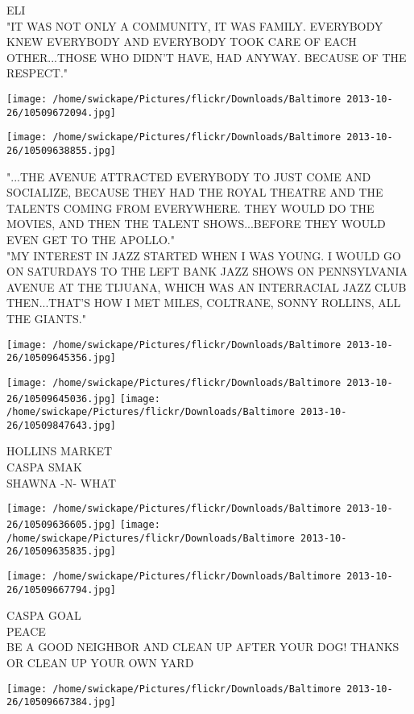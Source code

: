 \documentclass[10pt,letterpaper]{article}
\begin{document}
ELI\\
"IT WAS NOT ONLY A COMMUNITY, IT WAS FAMILY.  EVERYBODY KNEW EVERYBODY AND EVERYBODY TOOK CARE OF EACH OTHER...THOSE WHO DIDN'T HAVE, HAD ANYWAY.  BECAUSE OF THE RESPECT."
\pagebreak

\texttt{[image: /home/swickape/Pictures/flickr/Downloads/Baltimore 2013-10-26/10509672094.jpg]}

\vspace{0.25in}
\texttt{[image: /home/swickape/Pictures/flickr/Downloads/Baltimore 2013-10-26/10509638855.jpg]}

"...THE AVENUE ATTRACTED EVERYBODY TO JUST COME AND SOCIALIZE, BECAUSE THEY HAD THE ROYAL THEATRE AND THE TALENTS COMING FROM EVERYWHERE.  THEY WOULD DO THE MOVIES, AND THEN THE TALENT SHOWS...BEFORE THEY WOULD EVEN GET TO THE APOLLO."\\
"MY INTEREST IN JAZZ STARTED WHEN I WAS YOUNG.  I WOULD GO ON SATURDAYS TO THE LEFT BANK JAZZ SHOWS ON PENNSYLVANIA AVENUE AT THE TIJUANA, WHICH WAS AN INTERRACIAL JAZZ CLUB THEN...THAT'S HOW I MET MILES, COLTRANE, SONNY ROLLINS, ALL THE GIANTS."
\pagebreak

\texttt{[image: /home/swickape/Pictures/flickr/Downloads/Baltimore 2013-10-26/10509645356.jpg]}

\vspace{0.25in}
\texttt{[image: /home/swickape/Pictures/flickr/Downloads/Baltimore 2013-10-26/10509645036.jpg]}
\texttt{[image: /home/swickape/Pictures/flickr/Downloads/Baltimore 2013-10-26/10509847643.jpg]}

HOLLINS MARKET\\
CASPA SMAK\\
SHAWNA {-}N{-} WHAT
\pagebreak

\texttt{[image: /home/swickape/Pictures/flickr/Downloads/Baltimore 2013-10-26/10509636605.jpg]}
\texttt{[image: /home/swickape/Pictures/flickr/Downloads/Baltimore 2013-10-26/10509635835.jpg]}

\texttt{[image: /home/swickape/Pictures/flickr/Downloads/Baltimore 2013-10-26/10509667794.jpg]}

CASPA GOAL\\
PEACE\\
BE A GOOD NEIGHBOR AND CLEAN UP AFTER YOUR DOG! THANKS OR CLEAN UP YOUR OWN YARD
\pagebreak

\texttt{[image: /home/swickape/Pictures/flickr/Downloads/Baltimore 2013-10-26/10509667384.jpg]}
\end{document}

